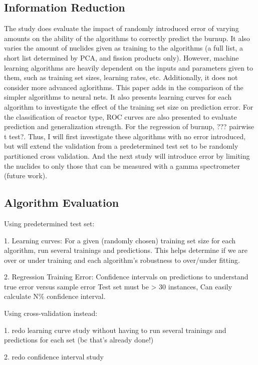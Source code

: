 \documentclass{anstrans}
\begin{document}
\subsection{Information Reduction}

The study does evaluate the impact of randomly introduced error of varying
amounts on the ability of the algorithms to correctly predict the burnup. It
also varies the amount of nuclides given as training to the algorithms (a full
list, a short list determined by PCA, and fission products only). However,
machine learning algorithms are heavily dependent on the inputs and parameters
given to them, such as training set sizes, learning rates, etc. Additionally,
it does not consider more advanced aglorithms. This paper adds in the
comparison of the simpler algorithms to neural nets. It also presents learning
curves for each algorithm to investigate the effect of the training set size on
prediction error. For the classification of reactor type, ROC curves are also
presented to evaluate prediction and generalization strength. For the
regression of burnup, ??? pairwise t test?.  Thus, I will first investigate
these algorithms with no error introduced, but will extend the validation from
a predetermined test set to be randomly partitioned cross validation.  And the
next study will introduce error by limiting the nuclides to only those that can
be measured with a gamma spectrometer (future work).

\subsection{Algorithm Evaluation}

Using predetermined test set:

1. Learning curves: For a given (randomly chosen) training set size for each
algorithm, run several trainings and predictions. This helps determine if we
are over or under training and each algorithm's robustness to over/under
fitting.  

2. Regression Training Error: Confidence intervals on predictions to understand
true error versus sample error Test set must be > 30 instances, Can easily
calculate N\% confidence interval.

Using cross-validation instead:

1. redo learning curve study without having to run several trainings and
predictions for each set (bc that's already done!)

2. redo confidence interval study
\end{document}
